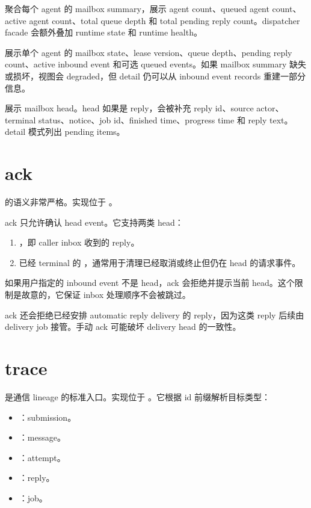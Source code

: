  聚合每个 agent 的 mailbox summary，展示 agent count、queued agent count、active agent count、total queue depth 和 total pending reply count。dispatcher facade 会额外叠加 runtime state 和 runtime health。

 展示单个 agent 的 mailbox state、lease version、queue depth、pending reply count、active inbound event 和可选 queued events。如果 mailbox summary 缺失或损坏，视图会 degraded，但 detail 仍可以从 inbound event records 重建一部分信息。

 展示 mailbox head。head 如果是 reply，会被补充 reply id、source actor、terminal status、notice、job id、finished time、progress time 和 reply text。detail 模式列出 pending items。

\section{ack}

 的语义非常严格。实现位于 。

ack 只允许确认 head event。它支持两类 head：

\begin{enumerate}
  \item {}，即 caller inbox 收到的 reply。
  \item 已经 terminal 的 ，通常用于清理已经取消或终止但仍在 head 的请求事件。
\end{enumerate}

如果用户指定的 inbound event 不是 head，ack 会拒绝并提示当前 head。这个限制是故意的，它保证 inbox 处理顺序不会被跳过。

ack 还会拒绝已经安排 automatic reply delivery 的 reply，因为这类 reply 后续由 delivery job 接管。手动 ack 可能破坏 delivery head 的一致性。

\section{trace}

 是通信 lineage 的标准入口。实现位于 。它根据 id 前缀解析目标类型：

\begin{itemize}
  \item {}：submission。
  \item {}：message。
  \item {}：attempt。
  \item {}：reply。
  \item {}：job。
\end{itemize}

